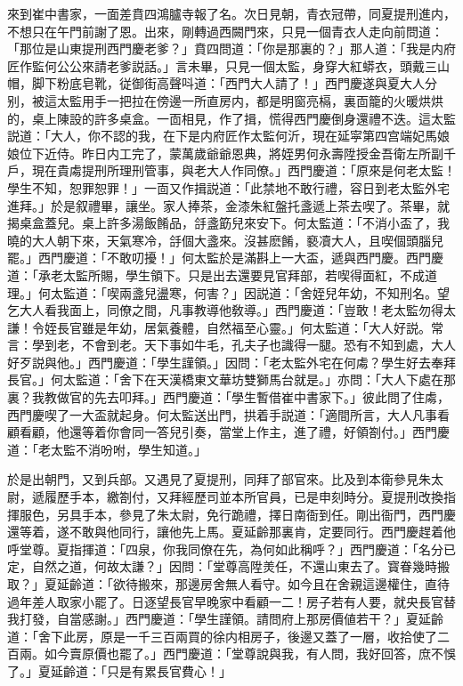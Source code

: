 來到崔中書家，一面差賁四鴻臚寺報了名。次日見朝，青衣冠帶，同夏提刑進内，不想只在午門前謝了恩。出來，剛轉過西闕門來，只見一個青衣人走向前問道：「那位是山東提刑西門慶老爹？」賁四問道：「你是那裏的？」那人道：「我是内府匠作監何公公來請老爹説話。」言未畢，只見一個太監，身穿大紅蟒衣，頭戴三山帽，脚下粉底皂靴，従御街高聲呌道：「西門大人請了！」西門慶遂與夏大人分别，被這太監用手一把拉在傍邊一所直房内，都是明窗亮槅，裏靣籠的火暖烘烘的，桌上陳設的許多桌盒。一靣相見，作了揖，慌得西門慶倒身還禮不迭。這太監説道：「大人，你不認的我，在下是内府匠作太監何沂，現在延寜第四宫端妃馬娘娘位下近侍。昨日内工完了，蒙萬歲爺爺恩典，將姪男何永壽陞授金吾衛左所副千戶，現在貴䖏提刑所理刑管事，與老大人作同僚。」西門慶道：「原來是何老太監！學生不知，恕罪恕罪！」一靣又作揖説道：「此禁地不敢行禮，容日到老太監外宅進拜。」於是叙禮畢，讓坐。家人捧茶，金漆朱紅盤托盞遞上茶去喫了。茶畢，就揭桌盒蓋兒。桌上許多湯飯餚品，㧱盞筯兒來安下。何太監道：「不消小盃了，我曉的大人朝下來，天氣寒冷，㧱個大盞來。沒甚麽餚，褻凟大人，且喫個頭腦兒罷。」西門慶道：「不敢叨擾！」何太監於是滿斟上一大盃，遞與西門慶。西門慶道：「承老太監所賜，學生領下。只是出去還要見官拜部，若喫得面紅，不成道理。」何太監道：「喫兩盞兒盪寒，何害？」因説道：「舍姪兒年幼，不知刑名。望乞大人看我面上，同僚之間，凡事教導他敎導。」西門慶道：「豈敢！老太監勿得太謙！令姪長官雖是年幼，居氣養體，自然福至心靈。」何太監道：「大人好説。常言：學到老，不會到老。天下事如牛毛，孔夫子也識得一腿。恐有不知到處，大人好歹説與他。」西門慶道：「學生謹領。」因問：「老太監外宅在何䖏？學生好去奉拜長官。」何太監道：「舍下在天漢橋東文華坊雙獅馬台就是。」亦問：「大人下處在那裏？我教做官的先去叩拜。」西門慶道：「學生暫借崔中書家下。」彼此問了住䖏，西門慶喫了一大盃就起身。何太監送出門，拱着手説道：「適間所言，大人凡事看顧看顧，他還等着你會同一答兒引奏，當堂上作主，進了禮，好領劄付。」西門慶道：「老太監不消吩咐，學生知道。」

於是出朝門，又到兵部。又遇見了夏提刑，同拜了部官來。比及到本衛參見朱太尉，遞履歷手本，繳劄付，又拜經歷司並本所官員，已是申刻時分。夏提刑改換指揮服色，另具手本，參見了朱太尉，免行跪禮，擇日南衙到任。剛出衙門，西門慶還等着，遂不敢與他同行，讓他先上馬。夏延齡那裏肯，定要同行。西門慶趕着他呼堂尊。夏指揮道：「四泉，你我同僚在先，為何如此稱呼？」西門慶道：「名分已定，自然之道，何故太謙？」因問：「堂尊高陞羙任，不還山東去了。寳眷幾時搬取？」夏延齡道：「欲待搬來，那邊房舍無人看守。如今且在舍親這邊權住，直待過年差人取家小罷了。日逐望長官早晚家中看顧一二！房子若有人要，就央長官替我打發，自當感謝。」西門慶道：「學生謹領。請問府上那房價値若干？」夏延齡道：「舍下此房，原是一千三百兩買的徐内相房子，後邊又蓋了一層，收拾使了二百兩。如今賣原價也罷了。」西門慶道：「堂尊說與我，有人問，我好回答，庶不悞了。」夏延齡道：「只是有累長官費心！」

